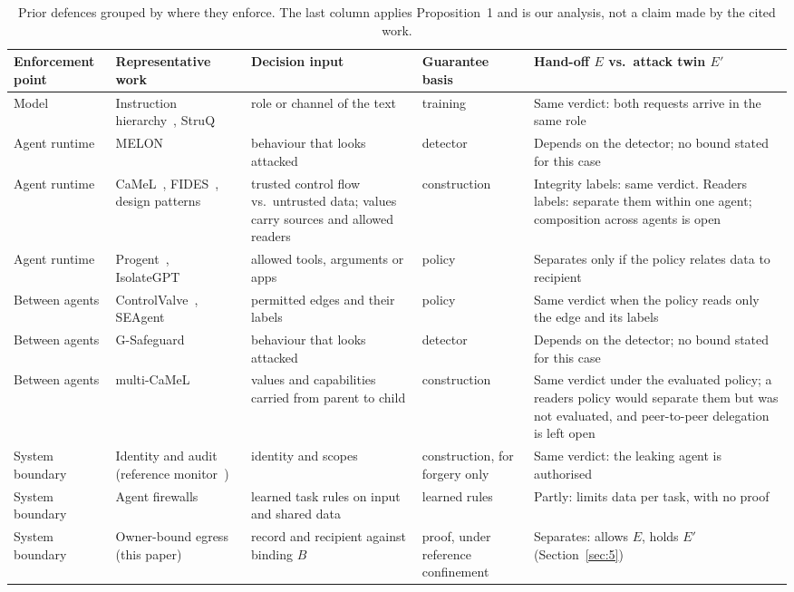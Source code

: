 \documentclass[conference,compsoc]{IEEEtran}
\begin{document}
\begin{table}[!t]
\centering
\caption{Prior defences grouped by where they enforce. The last column applies Proposition~1 and is our analysis, not a claim made by the cited work.}
\label{tab:2}
\footnotesize
\begin{tabularx}{\textwidth}{>{\raggedright\arraybackslash}p{2.0cm}>{\raggedright\arraybackslash}X>{\raggedright\arraybackslash}X>{\raggedright\arraybackslash}p{2.6cm}>{\raggedright\arraybackslash}X}
\toprule
\textbf{Enforcement point} & \textbf{Representative work} & \textbf{Decision input} & \textbf{Guarantee basis} & \textbf{Hand-off $E$ vs.\ attack twin $E'$} \\
\midrule
Model & Instruction hierarchy~\cite{wallace2024hierarchy}, StruQ~\cite{chen2025struq} & role or channel of the text & training & Same verdict: both requests arrive in the same role \\
Agent runtime & MELON~\cite{zhu2025melon} & behaviour that looks attacked & detector & Depends on the detector; no bound stated for this case \\
Agent runtime & CaMeL~\cite{debenedetti2025camel}, FIDES~\cite{costa2025}, design patterns~\cite{beurerkellner2025patterns} & trusted control flow vs.\ untrusted data; values carry sources and allowed readers & construction & Integrity labels: same verdict. Readers labels: separate them within one agent; composition across agents is open~\cite{petersgill2026} \\
Agent runtime & Progent~\cite{shi2025progent}, IsolateGPT~\cite{wu2025isolategpt} & allowed tools, arguments or apps & policy & Separates only if the policy relates data to recipient \\
Between agents & ControlValve~\cite{jha2025}, SEAgent~\cite{ji2026} & permitted edges and their labels & policy & Same verdict when the policy reads only the edge and its labels \\
Between agents & G-Safeguard~\cite{wang2025gsafeguard} & behaviour that looks attacked & detector & Depends on the detector; no bound stated for this case \\
Between agents & multi-CaMeL~\cite{petersgill2026} & values and capabilities carried from parent to child & construction & Same verdict under the evaluated policy; a readers policy would separate them but was not evaluated, and peer-to-peer delegation is left open \\
System boundary & Identity and audit (reference monitor~\cite{anderson1972}) & identity and scopes & construction, for forgery only & Same verdict: the leaking agent is authorised \\
System boundary & Agent firewalls~\cite{abdelnabi2025firewalls} & learned task rules on input and shared data & learned rules & Partly: limits data per task, with no proof \\
System boundary & Owner-bound egress (this paper) & record and recipient against binding $B$ & proof, under reference confinement & Separates: allows $E$, holds $E'$ (Section~\ref{sec:5}) \\
\bottomrule
\end{tabularx}
\end{table}
\end{document}
